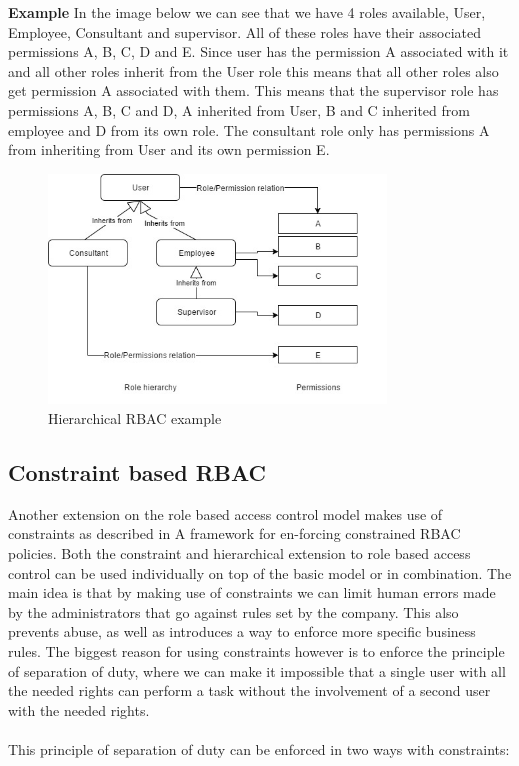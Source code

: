 \textbf{Example} In the image below we can see that we have 4 roles available, User, Employee, Consultant and supervisor. 
All of these roles have their associated permissions A, B, C, D and E.
Since user has the permission A associated with it and all other roles inherit from the User role this means that all other roles also get permission A associated with them.
This means that the supervisor role has permissions A, B, C and D, A inherited from User, B and C inherited from employee and D from its own role. 
The consultant role only has permissions A from inheriting from User and its own permission E.

\begin{figure}[!h]
    \centering
    \includegraphics[height=0.55\textwidth,width=0.8\textwidth]{Img/self/ExampleHierarch.jpg}
    \caption{Hierarchical RBAC example}
\end{figure}

\subsection{Constraint based RBAC}
Another extension on the role based access control model makes use of constraints as described in A framework for en-forcing constrained RBAC policies\cite{Constraint}.
Both the constraint and hierarchical extension to role based access control can be used individually on top of the basic model or in combination.
The main idea is that by making use of constraints we can limit human errors made by the administrators that go against rules set by the company.
This also prevents abuse, as well as introduces a way to enforce more specific business rules. 
The biggest reason for using constraints however is to enforce the principle of separation of duty, where we can make it impossible that a single user with all the needed rights can perform a task without the involvement of a second user with the needed rights.
\\
\\
This principle of separation of duty can be enforced in two ways with constraints:

